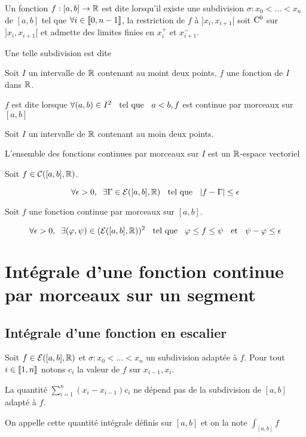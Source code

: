 \begin{dfn}
Un fonction $f : [a, b] \to \mathbb{R}$ est dite  lorsqu'il existe une subdivision $\sigma : x_0 < \ldots < x_n$
de $[a, b]$ tel que $\forall i \in \llbracket 0, n - 1 \rrbracket$, la restriction
de $f$ à $]x_i, x_{i + 1}[$ soit $\mathrm{C^{0}}$ sur $]x_i, x_{i + 1}[$ et
admette des limites finies en $x_i^+$ et $x_{i + 1}^-$.

Une telle subdivision est dite 
\end{dfn}

\begin{dfn}
Soit $I$ un intervalle de $\mathbb{R}$ contenant au moint deux points, $f$ une
fonction de $I$ dans $\mathbb{R}$.

$f$ est dite 
lorsque $\forall (a, b) \in I^2 \;\;\text{ tel que }\;\; a < b, f$ est continue par
morceaux sur $[a, b]$
\end{dfn}

\begin{prp}
Soit $I$ un intervalle de $\mathbb{R}$ contenant au moin deux points.

L'ensemble des fonctions continues par morceaux sur $I$ est un
$\mathbb{R}$-espace vectoriel
\end{prp}

\begin{prp}
Soit $f \in \mathcal{C}([a, b], \mathbb{R})$.

\[
    \forall \epsilon > 0, \;\;
    \exists \Gamma \in \mathcal{E}([a, b], \mathbb{R}) \;\;\text{ tel que }\;\;
    |f - \Gamma| \leq \epsilon
\]
\end{prp}

\begin{thm}
Soit $f$ une fonction continue par morceaux sur $[a, b]$.

\[
    \forall \epsilon > 0, \;\; \exists (\varphi, \psi) \in
    (\mathcal{E}([a, b], \mathbb{R}))^2 \;\;\text{ tel que }\;\; \varphi \leq f \leq \psi \;\;\text{ et }\;\;
    \psi - \varphi \leq \epsilon
\]
\end{thm}

\section{Intégrale d'une fonction continue par morceaux sur un segment}

\subsection{Intégrale d'une fonction en escalier}

\begin{dfn}
Soit $f \in \mathcal{E}([a, b], \mathbb{R})$ et $\sigma : x_0 < \ldots < x_n$ un
subdivision adaptée à $f$. Pour tout $i \in \llbracket 1, n \rrbracket$ notons
$c_i$ la valeur de $f$ sur $x_{i - 1}, x_i$.

La quantité $\sum_{i = 1}^n (x_i - x_{i - 1}) c_i$ ne dépend pas de la
subdivision de $[a, b]$ adapté à $f$.

On appelle cette quantité intégrale définis sur $[a, b]$ et on la note
$\int_{[a, b]} f$
\end{dfn}

